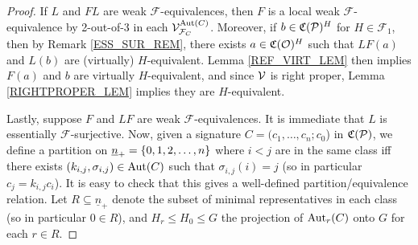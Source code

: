 \documentclass[a4paper,10pt
,draft
]{article}%
\renewcommand{\F}{\mathcal F}
\renewcommand{\1}{\eta}%
\begin{document}
\begin{proof}
      If $L$ and $FL$ are weak $\F$-equivalences,
      then $F$ is a local weak $\F$-equivalence by 2-out-of-3 in each $\V^{\Aut(C)}_{\F_C}$.
      Moreover, if $b \in \mathfrak C(\P)^H$ for $H \in \F_1$, then by Remark \ref{ESS_SUR_REM}, there exists $a \in \mathfrak C(\O)^H$ such that
      $LF(a)$ and $L(b)$ are (virtually) $H$-equivalent.
      Lemma \ref{REF_VIRT_LEM} then implies $F(a)$ and $b$ are virtually $H$-equivalent, 
      and since $\V$ is right proper, Lemma \ref{RIGHTPROPER_LEM} implies they are $H$-equivalent.

      Lastly, suppose $F$ and $LF$ are weak $\F$-equivalences.
      It is immediate that $L$ is essentially $\F$-surjective.
      Now, given a signature $C = (c_1,\ldots,c_n;c_0$) in $\C(\P)$,
      we define a partition on $\underline{n}_+ = \set{0,1,2,\dots,n}$ where
      $i < j$ are in the same class iff there exists $(k_{i,j}, \sigma_{i,j}) \in \Aut(C)$ such that
      $\sigma_{i,j}(i) = j$ (so in particular $c_j = k_{i,j} c_i$).
      It is easy to check that this gives a well-defined partition/equivalence relation.
      Let $R \subseteq \underline{n}_+$ denote the subset of minimal representatives in each class
      (so in particular $0 \in R$),
      and $H_r \leq H_0 \leq G$ the projection of $\Aut_r(C)$ onto $G$ for each $r \in R$.
      

\end{proof}
\end{document}
